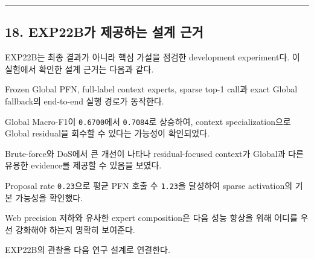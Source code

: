 \medskip\hrule\medskip
\subsection{18. EXP22B가 제공하는 설계 근거}
EXP22B는 최종 결과가 아니라 핵심 가설을 점검한 development experiment다. 이 실험에서 확인한 설계 근거는 다음과 같다.

\par\noindent \textbullet\enspace Frozen Global PFN, full-label context experts, sparse top-1 call과 exact Global fallback의 end-to-end 실행 경로가 동작한다.


\par\noindent \textbullet\enspace Global Macro-F1이 \texttt{0.\allowbreak{}6700}에서 \texttt{0.\allowbreak{}7084}로 상승하여, context specialization으로 Global residual을 회수할 수 있다는 가능성이 확인되었다.


\par\noindent \textbullet\enspace Brute-force와 DoS에서 큰 개선이 나타나 residual-focused context가 Global과 다른 유용한 evidence를 제공할 수 있음을 보였다.


\par\noindent \textbullet\enspace Proposal rate \texttt{0.\allowbreak{}23}으로 평균 PFN 호출 수 \texttt{1.\allowbreak{}23}을 달성하여 sparse activation의 기본 가능성을 확인했다.


\par\noindent \textbullet\enspace Web precision 저하와 유사한 expert composition은 다음 성능 향상을 위해 어디를 우선 강화해야 하는지 명확히 보여준다.


EXP22B의 관찰을 다음 연구 설계로 연결한다.


